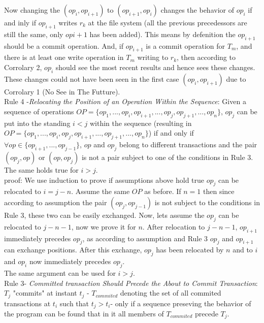 \documentclass[a4paper, 11pt]{article}
\begin{document}
Now changing the $(op_i, op_{i+1})$ to $(op_{i+1}, op_i)$ changes the behavior of $op_i$ if and inly if $op_{i+1}$ writes $r_k$ at the file system (all the previous precedessors are still the same, only $op{i+1}$ has been added). This means by defenition the $op_{i+1}$ should be a commit operation. And, if $op_{i+1}$ is a commit operation for $T_m$, and there is at least one write operation in $T_m$ writing to $r_k$, then according to Corrolary 2, $op_i$ should see the most recent results and hence sees these changes. These changes could not have been seen in the first case $(op_i, op_{i+1})$ due to Corrolary 1 (No See in The Futture).\\ 


Rule 4 -\emph{Relocating the Position of an Operation Within the Sequence}: Given a sequence of operations $OP = \{op_1, ..., op_i, op_{i+1}, ..., op_j, op_{j+1}, ..., op_n\}$, $op_j$ can be put into the standing $i<j$ within the sequence (resulting in $OP = \{op_1, ..., op_i,op_j,op_{i+1},..., op_{j+1},...,op_n\}$) if and only if $\forall op \in \{op_{i+1}, ..., op_{j-1}\}$, $op$ and $op_j$ belong to different transactions and the pair $(op_j, op)$ or $(op,op_j)$ is not a pair subject to one of the conditions in Rule 3. The same holds true for $i>j$.\\

proof: We use induction to prove if assumptions above hold true $op_j$ can be relocated to $i = j-n$. Assume the same $OP$ as before. If $n = 1$ then since according to assumption the pair $(op_j, op_{j-1})$ is not subject to the conditions in Rule 3, these two can be easily exchanged. Now, lets assume the $op_j$ can be relocated to $j-n-1$, now we prove it for $n$.  After relocation to $j-n-1$, $op_{i+1}$ immediately precedes $op_j$, as according to assumption and Rule 3 $op_j$ and $op_{i+1}$ can exchange positions. After this exchange, $op_j$ has been relocated by $n$ and to $i$ and $op_i$ now immediately precedes $op_j$.\\

The same argument can be used for $i > j$.\\

Rule 3-  \emph{Committed transaction Should Precede the About to Commit Transaction}: $T_j$ "commits" at instant $t_j$ - $T_{commited}$ denoting the set of all commited transactions at $t_i$ such that $t_j > t_i$- only if a sequence preseving the behavior of the program can be found that in it all members of $T_{commited}$ precede $T_j$.\\
\end{document}
